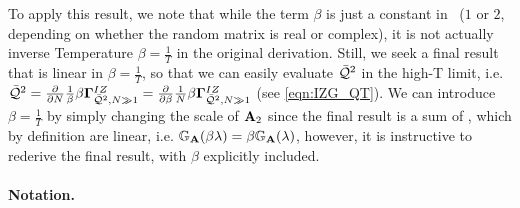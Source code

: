 To apply this result, we note that
while the term $\beta$ is just a constant in~\cite{Tanaka2008}
($1$ or $2$, depending on whether the random matrix is real or complex),
it is not actually inverse Temperature $\beta=\tfrac{1}{T}$ in the original derivation.
Still, we seek a final result that is linear in $\beta=\tfrac{1}{T}$,
so that we can easily evaluate $\bar{\mathcal{Q}}^{2}$ in the high-T limit, i.e.
$\bar{\mathcal{Q}}^{2}
=\tfrac{\partial}{\partial N}\tfrac{1}{\beta}\beta\mathbf{\Gamma}^{IZ}_{\bar{\mathcal{Q}}^{2},N\gg 1}
=\tfrac{\partial}{\partial \beta}\tfrac{1}{N}\beta\mathbf{\Gamma}^{IZ}_{\bar{\mathcal{Q}}^{2},N\gg 1}$
(see \ref{eqn:IZG_QT}).
We can introduce $\beta=\tfrac{1}{T}$ by
simply changing the scale of $\mathbf{A}_{2}$ since the final result is a sum of \RTransforms, which by definition
are linear, i.e. $\mathbb{G}_{\mathbf{A}}(\beta\lambda)=\beta \mathbb{G}_{\mathbf{A}}(\lambda)$, however, it is instructive
to rederive the final result, with $\beta$ explicitly included.


\paragraph{Notation.}

